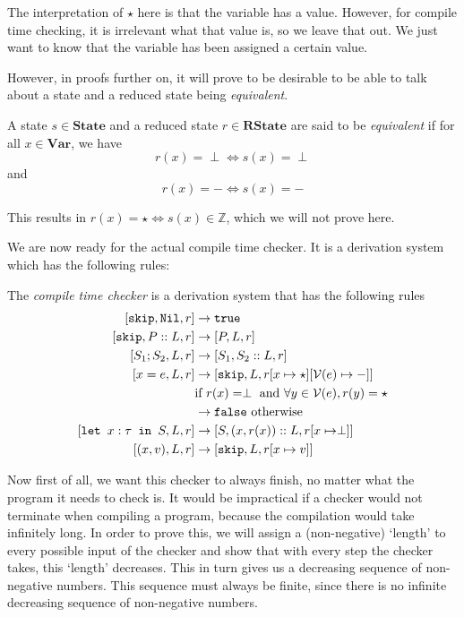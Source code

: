 The interpretation of $\star$ here is that the variable has a value. However, for compile time checking, it is irrelevant what that value is, so we leave that out. We just want to know that the variable has been assigned a certain value.

However, in proofs further on, it will prove to be desirable to be able to talk about a state and a reduced state being \emph{equivalent}.

\begin{definition}
A state $s\in\textbf{State}$ and a reduced state $r\in\textbf{RState}$ are said to be \emph{equivalent} if for all $x\in\textbf{Var}$, we have 
$$r(x) = \perp \iff s(x) = \perp$$
and
$$r(x) = - \iff s(x) = -$$
\end{definition}

This results in $r(x) = \star \iff s(x)\in \mathbb{Z}$, which we will not prove here. 

We are now ready for the actual compile time checker. It is a derivation system which has the following rules:

\begin{definition}
\label{compiletimechecker}
The \emph{compile time checker} is a derivation system that has the following rules
\begin{align*}
\cc{\texttt{skip}}{\texttt{Nil}}{r} & \to \texttt{true}  \\
\cc{\texttt{skip}} {P::L}{ r}       & \to \cc{P}{L}{r}  \\
\cc{S_1; S_2}{L}{r}                 & \to \cc{S_1}{S_2::L}{r}  \\
\cc{x=e}{L}{r}                     & \to \cc{\texttt{skip}}{L}{r[x\mapsto \star][\mathcal{V}(e) \mapsto -]} \\
                                    & \textrm{if }r(x) = \perp \textrm{ and } \forall y \in \mathcal{V}(e), r(y) = \star \\
                                    & \to \texttt{false} \textrm{ otherwise}\\
\cc{\letm{x}{S}}{L}{r} & \to \cc{S}{(x,r(x))::L}{r[x\mapsto \perp]} \\
\cc{(x,v)}{L}{r}                    & \to \cc{\texttt{skip}}{L}{r[x \mapsto v]}
\end{align*}
\end{definition}

Now first of all, we want this checker to always finish, no matter what the program it needs to check is. It would be impractical if a checker would not terminate when compiling a program, because the compilation would take infinitely long. In order to prove this, we will assign a (non-negative) `length' to every possible input of the checker and show that with every step the checker takes, this `length' decreases. This in turn gives us a decreasing sequence of non-negative numbers. This sequence must always be finite, since there is no infinite decreasing sequence of non-negative numbers. 

